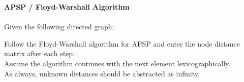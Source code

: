 \textbf{\LARGE{\color{tumgadPurple}APSP / Floyd-Warshall Algorithm}}\\
\\
\noindent
Given the following directed graph:
\begin{center}
\end{center}
Follow the Floyd-Warshall algorithm for APSP and enter the node distance matrix after each step.\\
Assume the algorithm continues with the next element lexicographically.\\
As always, unknown distances should be abstracted as infinity.\\
